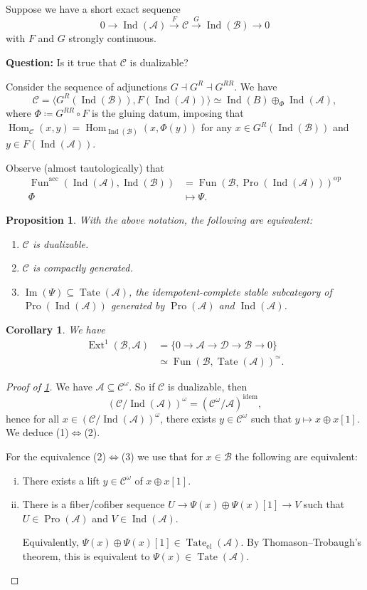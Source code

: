 \documentclass[draft]{amsart}
\newcommand{\cat}[1]{\mathcal{#1}}
\newcommand{\op}{\mathrm{op}}
\DeclareMathOperator{\Hom}{Hom}
\DeclareMathOperator{\Ind}{Ind}
\DeclareMathOperator{\Fun}{Fun}
\DeclareMathOperator{\Pro}{Pro}
\DeclareMathOperator{\Image}{Im}
\DeclareMathOperator{\Tate}{Tate}
\DeclareMathOperator{\Ext}{Ext}
\newtheorem{prop}[thm]{Proposition}
\newtheorem{cor}[thm]{Corollary}
\theoremstyle{definition}
\begin{document}
Suppose we have a short exact sequence
\[
0\to \Ind(\cat A) \xrightarrow{F} \cat C \xrightarrow{G} \Ind(\cat B) \to 0
\]
with $F$ and $G$ strongly continuous.

\textbf{Question:} Is it true that $\cat C$ is dualizable?

Consider the sequence of adjunctions $G\dashv G^R \dashv G^{RR}$. We have
\[
\cat C = \langle G^R(\Ind(\cat B)), F(\Ind(\cat A))\rangle \simeq \Ind(B) \oplus_{\Phi} \Ind(\cat A),
\]
where $\Phi \coloneqq G^{RR}\circ F$ is the gluing datum, imposing that $\Hom_{\cat C}(x,y) = \Hom_{\Ind(\cat B)}(x, \Phi(y))$ for any $x\in G^R(\Ind(\cat B))$ and $y\in F(\Ind(\cat A))$.

Observe (almost tautologically) that 
\begin{align*}
\Fun^{\mathrm{acc}}(\Ind(\cat A), \Ind(\cat B)) &= \Fun(\cat B, \Pro(\Ind(\cat A)))^{\op} \\
\Phi &\mapsto \Psi.
\end{align*}

\begin{prop}\label{Efimov:Tate}
With the above notation, the following are equivalent:
\begin{enumerate}[(1)]
\item $\cat C$ is dualizable.
\item $\cat C$ is compactly generated.
\item $\Image(\Psi) \subseteq \Tate(\cat A)$, the idempotent-complete stable subcategory of $\Pro(\Ind(\cat A))$ generated by $\Pro(\cat A)$ and $\Ind(\cat A)$.
\end{enumerate}
\end{prop}

\begin{cor}
We have
\begin{align*}
\Ext^1(\cat B, \cat A) &= \{0\to \cat A\to \cat D\to \cat B\to 0\} \\
&\simeq \Fun(\cat B, \Tate(\cat A))^{\simeq}.
\end{align*}
\end{cor}

\begin{proof}[Proof of \cref{Efimov:Tate}]
We have $\cat A \subseteq \cat C^\omega$. So if $\cat C$ is dualizable, then
\[
(\cat C/\Ind(\cat A))^\omega = (\cat C^\omega/\cat A)^{\mathrm{idem}},
\]
hence for all $x\in (\cat C/\Ind(\cat A))^{\omega}$, there exists $y\in \cat C^{\omega}$ such that $y\mapsto x\oplus x[1]$. We deduce (1)$\iff$(2).

For the equivalence (2)$\iff$(3) we use that for $x\in \cat B$ the following are equivalent:
\begin{enumerate}[(i)]
\item There exists a lift $y\in \cat C^\omega$ of $x\oplus x[1]$.
\item There is a fiber/cofiber sequence $U\to \Psi(x) \oplus \Psi(x)[1] \to V$ such that $U\in \Pro(\cat A)$ and $V\in \Ind(\cat A)$.

Equivalently, $\Psi(x) \oplus \Psi(x)[1] \in \Tate_{\mathrm{el}}(\cat A)$. By Thomason--Trobaugh's theorem, this is equivalent to $\Psi(x) \in \Tate(\cat A)$.
\end{enumerate}
\end{proof}
\end{document}
